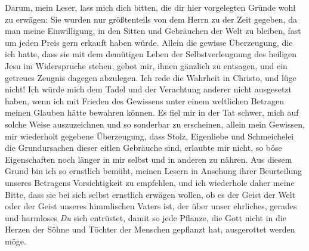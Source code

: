 Darum, mein Leser, lass mich dich bitten, die dir hier vorgelegten Gründe wohl
zu
erwägen: Sie wurden nur größtenteils von dem Herrn zu der Zeit gegeben, da man
meine Einwilligung, in den Sitten und Gebräuchen der Welt zu bleiben, fast um
jeden Preis gern erkauft haben würde. Allein die gewisse Überzeugung, die ich
hatte, dass sie mit dem demütigen Leben der Selbstverleugnung des heiligen Jesu
im Widerspruche stehen, gebot mir, ihnen gänzlich zu entsagen, und ein getreues
Zeugnis dagegen abzulegen. Ich rede die Wahrheit in
Christo, und lüge nicht! Ich
würde mich dem Tadel und der Verachtung anderer nicht ausgesetzt haben, wenn ich
mit Frieden des Gewissens unter einem weltlichen Betragen meinen Glauben hätte
bewahren können. Es fiel mir in der Tat schwer, mich auf solche Weise
auszuzeichnen und so sonderbar zu erscheinen, allein mein Gewissen, mir
wiederholt gegebene Überzeugung, dass Stolz, Eigenliebe und Schmeichelei die
Grundursachen dieser eitlen Gebräuche sind, erlaubte mir nicht, so böse
Eigenschaften noch länger in mir selbst und in anderen zu nähren. Aus diesem
Grund bin ich so ernstlich bemüht, meinen Lesern in Ansehung ihrer
Beurteilung unseres Betragens Vorsichtigkeit zu empfehlen, und ich wiederhole
daher meine Bitte, dass sie bei sich selbst ernstlich erwägen wollen, ob es der
Geist der Welt oder der Geist unseres himmlischen Vaters ist, der über unser
ehrliches, gerades und harmloses \textit{Du} sich entrüstet, damit so jede
Pflanze,
die Gott nicht in die Herzen der Söhne und Töchter der Menschen gepflanzt hat,
ausgerottet werden möge.

\label{kap10_ende}


